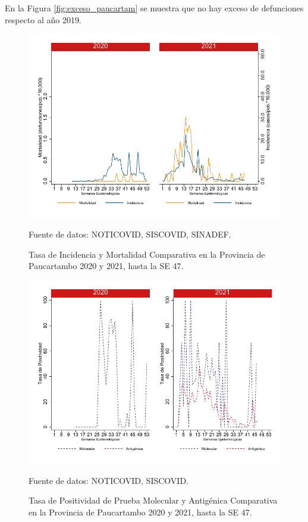 \documentclass[12pt,a4paper,openany]{book}
\begin{document}
	En la Figura \ref{fig:exceso_paucartam} se muestra que no hay exceso de defunciones respecto al año 2019.
		
		\begin{figure}[h]
			\caption{Tasa de Incidencia y Mortalidad Comparativa en la Provincia de Paucartambo 2020 y 2021, hasta la SE 47.}\label{fig:inc_mort_paucartam}
			\begin{center}
				\includegraphics[width=0.7\linewidth]{../figuras/incidencia_mortalidad_20_21_11}
			\end{center}
			{\footnotesize {Fuente de datos: NOTICOVID, SISCOVID, SINADEF.}}
		\end{figure}
		
		\begin{figure}[h]
			\caption{Tasa de Positividad de Prueba Molecular y Antigénica Comparativa en la Provincia de Paucartambo 2020 y 2021, hasta la SE 47.}\label{fig:positividad_paucartam}
			\begin{center}
				\includegraphics[width=0.7\linewidth]{../figuras/positividad_20_21_11}
			\end{center}
			{\footnotesize {Fuente de datos: NOTICOVID, SISCOVID.}}
		\end{figure}
		
\end{document}
